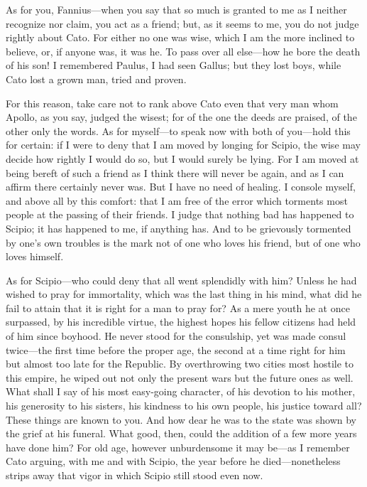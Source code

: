  As for you, Fannius—when you say that so much is granted to me as I neither recognize nor claim, you act as a friend; but, as it seems to me, you do not judge rightly about Cato. For either no one was wise, which I am the more inclined to believe, or, if anyone was, it was he. To pass over all else—how he bore the death of his son! I remembered Paulus, I had seen Gallus; but they lost boys, while Cato lost a grown man, tried and proven.

 For this reason, take care not to rank above Cato even that very man whom Apollo, as you say, judged the wisest; for of the one the deeds are praised, of the other only the words. As for myself—to speak now with both of you—hold this for certain: if I were to deny that I am moved by longing for Scipio, the wise may decide how rightly I would do so, but I would surely be lying. For I am moved at being bereft of such a friend as I think there will never be again, and as I can affirm there certainly never was. But I have no need of healing. I console myself, and above all by this comfort: that I am free of the error which torments most people at the passing of their friends. I judge that nothing bad has happened to Scipio; it has happened to me, if anything has. And to be grievously tormented by one's own troubles is the mark not of one who loves his friend, but of one who loves himself.

 As for Scipio—who could deny that all went splendidly with him? Unless he had wished to pray for immortality, which was the last thing in his mind, what did he fail to attain that it is right for a man to pray for? As a mere youth he at once surpassed, by his incredible virtue, the highest hopes his fellow citizens had held of him since boyhood. He never stood for the consulship, yet was made consul twice—the first time before the proper age, the second at a time right for him but almost too late for the Republic. By overthrowing two cities most hostile to this empire, he wiped out not only the present wars but the future ones as well. What shall I say of his most easy-going character, of his devotion to his mother, his generosity to his sisters, his kindness to his own people, his justice toward all? These things are known to you. And how dear he was to the state was shown by the grief at his funeral. What good, then, could the addition of a few more years have done him? For old age, however unburdensome it may be—as I remember Cato arguing, with me and with Scipio, the year before he died—nonetheless strips away that vigor in which Scipio still stood even now.

